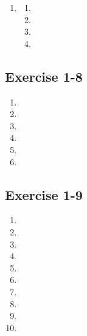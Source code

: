 \begin{enumerate}[itemsep=5pt, label=\textbf{\arabic*}. ]
\item %
\begin{multicols}{2}
\begin{enumerate}[itemsep=5pt, label=\textbf{(\alph*)} ] 
\item %
\item %
\item %
\item %
\end{enumerate}
\end{multicols}

\end{enumerate}


\subsection{Exercise 1-8} %

\begin{multicols}{2}
\begin{enumerate}[itemsep=5pt, label=\textbf{\arabic*}. ] 
\item %
\item %
\item %
\item %
\item %
\item %
\end{enumerate}
\end{multicols}


\subsection{Exercise 1-9} %

\begin{multicols}{2}
\begin{enumerate}[itemsep=5pt, label=\textbf{\arabic*}. ] 
\item %
\item %
\item %
\item %
\item %
\item %
\item %
\item %
\item %
\item %
\end{enumerate}
\end{multicols}


